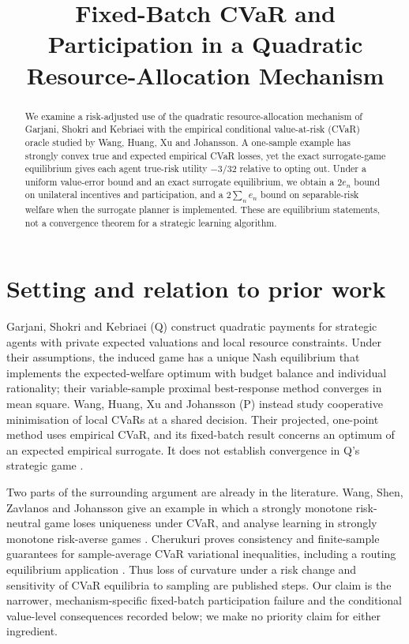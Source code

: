 \documentclass{article}
\title{Fixed-Batch CVaR and Participation in a Quadratic Resource-Allocation Mechanism}
\begin{document}
\maketitle

\begin{abstract}
We examine a risk-adjusted use of the quadratic resource-allocation mechanism of Garjani, Shokri and Kebriaei with the empirical conditional value-at-risk (CVaR) oracle studied by Wang, Huang, Xu and Johansson. A one-sample example has strongly convex true and expected empirical CVaR losses, yet the exact surrogate-game equilibrium gives each agent true-risk utility \(-3/32\) relative to opting out. Under a uniform value-error bound and an exact surrogate equilibrium, we obtain a \(2e_n\) bound on unilateral incentives and participation, and a \(2\sum_n e_n\) bound on separable-risk welfare when the surrogate planner is implemented. These are equilibrium statements, not a convergence theorem for a strategic learning algorithm. %
\end{abstract}

\section{Setting and relation to prior work}

Garjani, Shokri and Kebriaei (Q) construct quadratic payments for strategic agents with private expected valuations and local resource constraints. Under their assumptions, the induced game has a unique Nash equilibrium that implements the expected-welfare optimum with budget balance and individual rationality; their variable-sample proximal best-response method converges in mean square. Wang, Huang, Xu and Johansson (P) instead study cooperative minimisation of local CVaRs at a shared decision. Their projected, one-point method uses empirical CVaR, and its fixed-batch result concerns an optimum of an expected empirical surrogate. It does not establish convergence in Q's strategic game \cite{garjani2026mechanism,wang2026distributed}. %

Two parts of the surrounding argument are already in the literature. Wang, Shen, Zavlanos and Johansson give an example in which a strongly monotone risk-neutral game loses uniqueness under CVaR, and analyse learning in strongly monotone risk-averse games \cite{wang2024learning}. Cherukuri proves consistency and finite-sample guarantees for sample-average CVaR variational inequalities, including a routing equilibrium application \cite{cherukuri2024sample}. Thus loss of curvature under a risk change and sensitivity of CVaR equilibria to sampling are published steps. Our claim is the narrower, mechanism-specific fixed-batch participation failure and the conditional value-level consequences recorded below; we make no priority claim for either ingredient. %
\end{document}
